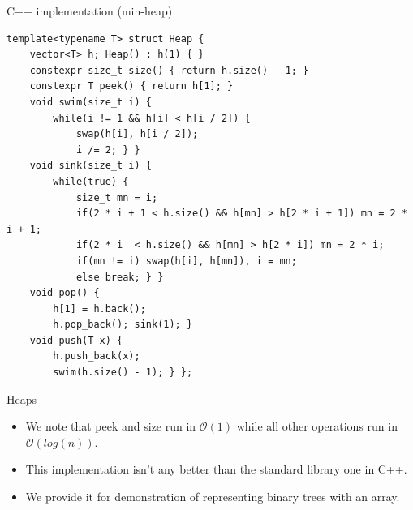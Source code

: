 \documentclass{beamer}
\begin{document}
\begin{frame}{C++ implementation (min-heap)}
    \scriptsize
    \begin{verbatim}
template<typename T> struct Heap {
    vector<T> h; Heap() : h(1) { }
    constexpr size_t size() { return h.size() - 1; }
    constexpr T peek() { return h[1]; }
    void swim(size_t i) {
        while(i != 1 && h[i] < h[i / 2]) {
            swap(h[i], h[i / 2]);
            i /= 2; } }
    void sink(size_t i) {
        while(true) {
            size_t mn = i;
            if(2 * i + 1 < h.size() && h[mn] > h[2 * i + 1]) mn = 2 * i + 1;
            if(2 * i  < h.size() && h[mn] > h[2 * i]) mn = 2 * i;
            if(mn != i) swap(h[i], h[mn]), i = mn;
            else break; } }
    void pop() {
        h[1] = h.back();
        h.pop_back(); sink(1); }
    void push(T x) {
        h.push_back(x);
        swim(h.size() - 1); } };
    \end{verbatim}
\end{frame}

\begin{frame}[plain]{Heaps}
    \begin{itemize}
        \item<1-> We note that peek and size run in $\mathcal{O}(1)$ while all other operations run in $\mathcal{O}(log(n))$.
        \item<2-> This implementation isn't any better than the standard library one in C++.
        \item<3-> We provide it for demonstration of representing binary trees with an array.
    \end{itemize}
\end{frame}
\end{document}
